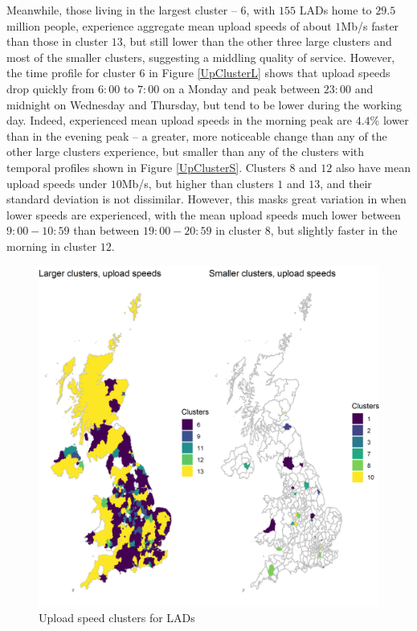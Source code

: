 \documentclass[,]{sagej}
\begin{document}
Meanwhile, those living in the largest cluster -- \(6\), with \(155\)
LADs home to \(29.5\) million people, experience aggregate mean upload
speeds of about \(1\)Mb/s faster than those in cluster \(13\), but still
lower than the other three large clusters and most of the smaller
clusters, suggesting a middling quality of service. However, the time
profile for cluster \(6\) in Figure \ref{UpClusterL} shows that upload
speeds drop quickly from \(6:00\) to \(7:00\) on a Monday and peak
between \(23:00\) and midnight on Wednesday and Thursday, but tend to be
lower during the working day. Indeed, experienced mean upload speeds in
the morning peak are \(4.4\)\% lower than in the evening peak -- a
greater, more noticeable change than any of the other large clusters
experience, but smaller than any of the clusters with temporal profiles
shown in Figure \ref{UpClusterS}. Clusters \(8\) and \(12\) also have
mean upload speeds under \(10\)Mb/s, but higher than clusters \(1\) and
\(13\), and their standard deviation is not dissimilar. However, this
masks great variation in when lower speeds are experienced, with the
mean upload speeds much lower between \(9:00-10:59\) than between
\(19:00-20:59\) in cluster \(8\), but slightly faster in the morning in
cluster \(12\).

\begin{figure}
\includegraphics[width=0.95\linewidth]{figures/map.up.clusters} \caption{\label{map.up.clusters}Upload speed clusters for LADs}\label{fig:unnamed-chunk-5}
\end{figure}
\end{document}
